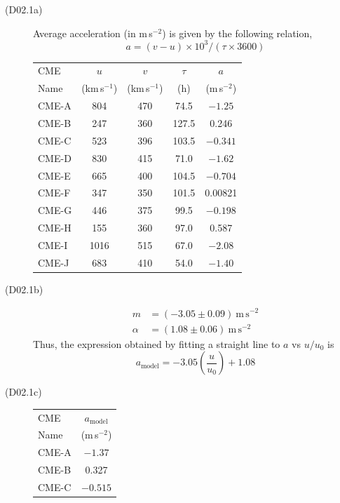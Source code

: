 \begin{description}
\item[(D02.1a)] Average acceleration (in m\,s$^{-2}$) is given by the
  following relation,
  \[
  a = (v-u)\times 10^{3}/(\tau\times 3600)
  \]
  \begin{center}
  \begin{tabular}{l c c c c}
  \toprule
  CME & $u$ & $v$ & $\tau$ & $a$\\
  Name & (km\,s$^{-1}$) & (km\,s$^{-1}$) & (h) & (m\,s$^{-2}$)\\
  \midrule
  CME-A & 804  & 470 & 74.5  & $-1.25$\\
  CME-B & 247  & 360 & 127.5 & 0.246\\
  CME-C & 523  & 396 & 103.5 & $-0.341$\\
  CME-D & 830  & 415 & 71.0  & $-1.62$\\
  CME-E & 665  & 400 & 104.5 & $-0.704$\\
  CME-F & 347  & 350 & 101.5 & 0.00821\\
  CME-G & 446  & 375 & 99.5  & $-0.198$\\
  CME-H & 155  & 360 & 97.0  & 0.587\\
  CME-I & 1016 & 515 & 67.0  & $-2.08$\\
  CME-J & 683  & 410 & 54.0  & $-1.40$\\
  \bottomrule
  \end{tabular}
  \end{center}
\item[(D02.1b)]
  \begin{align*}
  m &= (-3.05 \pm 0.09)~\mathrm{m\,s^{-2}}\\
  \alpha &= (1.08 \pm 0.06)~\mathrm{m\,s^{-2}}
  \end{align*}
  Thus, the expression obtained by fitting a straight line to $a$ vs $u/u_0$
  is
  \[
  a_{\mathrm{model}} = -3.05\left(\frac{u}{u_0}\right) + 1.08
  \]
\item[(D02.1c)]
  \begin{center}
  \begin{tabular}{l c}
  \toprule
  CME & $a_{\mathrm{model}}$\\
  Name & (m\,s$^{-2}$)\\
  \midrule
  CME-A & $-1.37$\\
  CME-B & 0.327\\
  CME-C & $-0.515$\\

\end{tabular}
\end{center}
\end{description}
